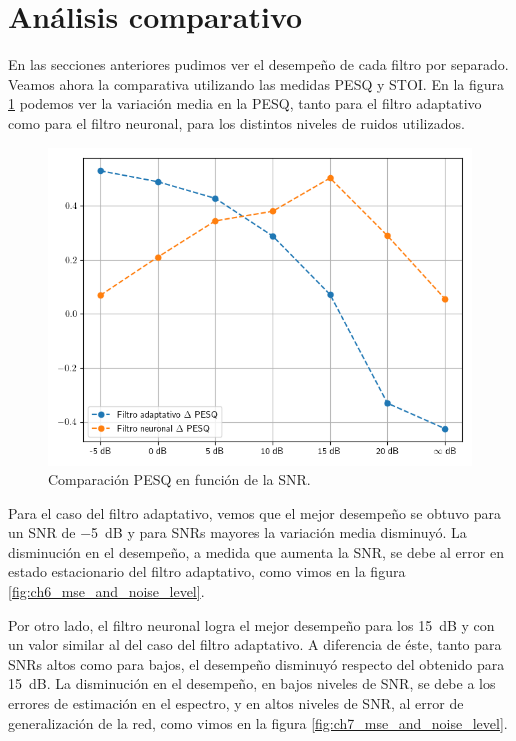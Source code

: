 \section{Análisis comparativo}

En las secciones anteriores pudimos ver el desempeño de cada filtro por separado. Veamos ahora la comparativa utilizando las medidas PESQ y STOI. En la figura \ref{fig:ch8_pesq_comparison} podemos ver la variación media en la PESQ, tanto para el filtro adaptativo como para el filtro neuronal, para los distintos niveles de ruidos utilizados.

\begin{figure}[h]
	\centering
	\centerline{\includegraphics[scale=0.75]{images/ch8/comparison_pesq.png}}
	\caption{Comparación PESQ en función de la SNR.}
	\label{fig:ch8_pesq_comparison}
\end{figure}

Para el caso del filtro adaptativo, vemos que el mejor desempeño se obtuvo para un SNR de \SI{-5}{dB} y para SNRs mayores la variación media disminuyó. La disminución en el desempeño, a medida que aumenta la SNR, se debe al error en estado estacionario del filtro adaptativo, como vimos en la figura \ref{fig:ch6_mse_and_noise_level}.

Por otro lado, el filtro neuronal logra el mejor desempeño para los \SI{15}{dB} y con un valor similar al del caso del filtro adaptativo. A diferencia de éste, tanto para SNRs altos como para bajos, el desempeño disminuyó respecto del obtenido para \SI{15}{dB}. La disminución en el desempeño, en bajos niveles de SNR, se debe a los errores de estimación en el espectro, y en altos niveles de SNR, al error de generalización de la red, como vimos en la figura \ref{fig:ch7_mse_and_noise_level}.	

